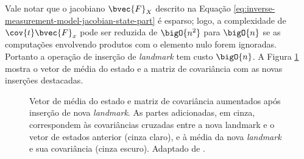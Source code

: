 Vale notar que o jacobiano $\bvec{F}_X$ descrito na Equação \ref{eq:inverse-measurement-model-jacobian-state-part} é esparso; logo, a complexidade de $\cov{t}\bvec{F}_x$ pode ser reduzida de $\bigO{n^2}$ para $\bigO{n}$ se as computações envolvendo produtos com o elemento nulo forem ignoradas. Portanto a operação de inserção de \textit{landmark} tem custo $\bigO{n}$. A Figura \ref{fig:ekf-slam-landmark-insertion} mostra o vetor de média do estado e a matriz de covariância com as novas inserções destacadas.

\begin{figure}[h]
  \centering
  
  \caption[Elementos inseridos no vetor média e matriz de covariância do Filtro de Kalman Estendido de um sistema SLAM durante a observação de um novo \textit{landmark}]{Vetor de média do estado e matriz de covariância aumentados após inserção de nova \textit{landmark}. As partes adicionadas, em cinza, correspondem às covariâncias cruzadas entre a nova landmark e o vetor de estados anterior (cinza claro), e à média da nova \textit{landmark} e sua covariância (cinza escuro). Adaptado de \cite[p.~11]{jsola}.}
  \label{fig:ekf-slam-landmark-insertion}
\end{figure}

